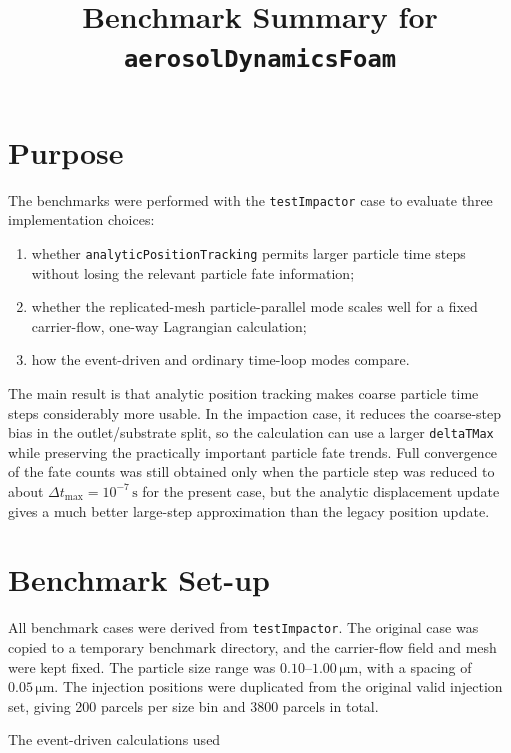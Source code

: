 \documentclass[11pt]{article}
\title{Benchmark Summary for \texttt{aerosolDynamicsFoam}}
\author{}
\date{}
\begin{document}
\maketitle

\section{Purpose}

The benchmarks were performed with the \texttt{testImpactor} case to evaluate
three implementation choices:

\begin{enumerate}
    \item whether \texttt{analyticPositionTracking} permits larger particle
    time steps without losing the relevant particle fate information;
    \item whether the replicated-mesh particle-parallel mode scales well for a
    fixed carrier-flow, one-way Lagrangian calculation;
    \item how the event-driven and ordinary time-loop modes compare.
\end{enumerate}

The main result is that analytic position tracking makes coarse particle time
steps considerably more usable.  In the impaction case, it reduces the
coarse-step bias in the outlet/substrate split, so the calculation can use a
larger \texttt{deltaTMax} while preserving the practically important particle
fate trends.  Full convergence of the fate counts was still obtained only when
the particle step was reduced to about \(\Delta t_{\max}=10^{-7}\,\mathrm{s}\)
for the present case, but the analytic displacement update gives a much better
large-step approximation than the legacy position update.

\section{Benchmark Set-up}

All benchmark cases were derived from \texttt{testImpactor}.  The original case
was copied to a temporary benchmark directory, and the carrier-flow field and
mesh were kept fixed.  The particle size range was
\(0.10\)--\(1.00\,\si{\micro\metre}\), with a spacing of
\(0.05\,\si{\micro\metre}\).  The injection positions were duplicated from the
original valid injection set, giving 200 parcels per size bin and 3800 parcels
in total.

The event-driven calculations used
\end{document}
